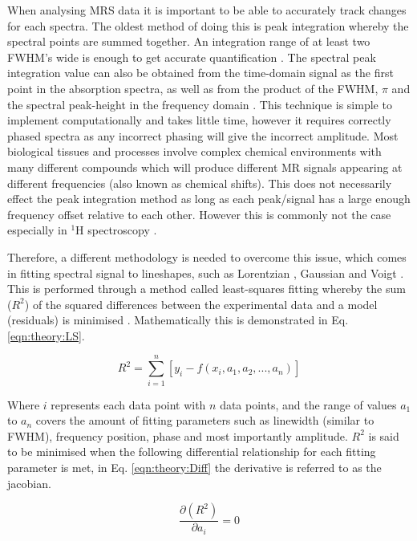 When analysing \ac{MRS} data it is important to be able to accurately track changes for each spectra. The oldest method of doing this is peak integration whereby the spectral points are summed together. An integration range of at least two \ac{FWHM}'s wide is enough to get accurate quantification \cite{Near2021PreprocessingRecommendations}. The spectral peak integration value can also be obtained from the time-domain signal as the first point in the absorption spectra, as well as from the product of the \ac{FWHM}, $\pi$ and the spectral peak-height in the frequency domain \cite{deGraaf2019InSpectroscopy}. This technique is simple to implement computationally and takes little time, however it requires correctly phased spectra as any incorrect phasing will give the incorrect amplitude. Most biological tissues and processes involve complex chemical environments with many different compounds which will produce different MR signals appearing at different frequencies (also known as chemical shifts). This does not necessarily effect the peak integration method as long as each peak/signal has a large enough frequency offset relative to each other. However this is commonly not the case especially in $^1$H spectroscopy \cite{Alger2010QuantitativeReview}. 

Therefore, a different methodology is needed to overcome this issue, which comes in fitting spectral signal to lineshapes, such as Lorentzian \cite{Lorentz1895TheHeat}, Gaussian and Voigt \cite{Near2021PreprocessingRecommendations}. This is performed through a method called least-squares \cite{Golub1973TheSeparate} fitting whereby the sum ($R^2$) of the squared differences between the experimental data and a model (residuals) is minimised \cite{Vanhamme2001MRMethods}. Mathematically this is demonstrated in Eq. \ref{eqn:theory:LS}.

\begin{equation}
    R^2 = \sum_{i=1}^{n}[y_i - f(x_i,a_1,a_2,...,a_n)]
    \label{eqn:theory:LS}
\end{equation}

\noindent Where $i$ represents each data point with $n$ data points, and the range of values $a_1$ to $a_n$ covers the amount of fitting parameters such as linewidth (similar to \ac{FWHM}), frequency position, phase and most importantly amplitude. $R^2$ is said to be minimised when the following differential relationship for each fitting parameter is met, in Eq. \ref{eqn:theory:Diff} the derivative is referred to as the jacobian.

\begin{equation}
    \frac{\partial (R^2)}{\partial a_i} = 0
    \label{eqn:theory:Diff}
\end{equation}

